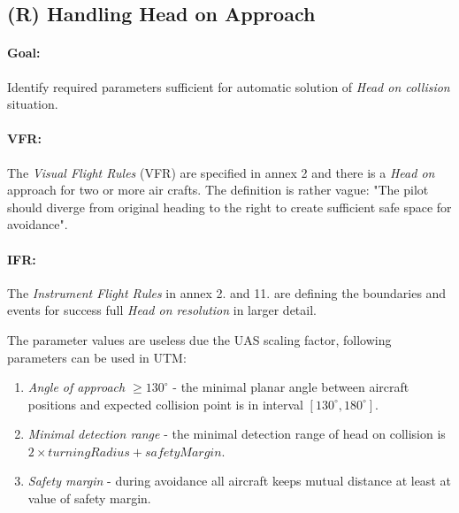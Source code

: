 \subsection{(R) Handling Head on Approach}\label{sec:handlingHeadOnApproach}

\paragraph{Goal:} Identify required parameters sufficient for automatic solution of \emph{Head on collision} situation.

\paragraph{VFR:} The \emph{Visual Flight Rules} (VFR) are specified in annex 2 \cite{icaoAnnex2} and there is a \emph{Head on} approach for two or more air crafts. The definition is rather vague: "The pilot should diverge from original heading to the right to create sufficient safe space for avoidance". 

\paragraph{IFR:} The \emph{Instrument Flight Rules} in annex 2. \cite{icaoAnnex2} and 11. \cite{icaoAnnex11} are defining the boundaries and events for success full \emph{Head on resolution} in larger detail. 

The parameter values are useless due the UAS scaling factor, following parameters can be used in UTM:

\begin{enumerate}
    \item \emph{Angle of approach $\ge 130^\circ$} - the minimal planar angle between aircraft positions and expected collision point is in interval $[130^\circ,180^\circ]$.
    
    \item \emph{Minimal detection range} - the minimal detection range of head on collision is $2\times turning Radius + safety Margin$.
    
    \item \emph{Safety margin} - during avoidance all aircraft keeps mutual distance at least at value of safety margin.
\end{enumerate}

